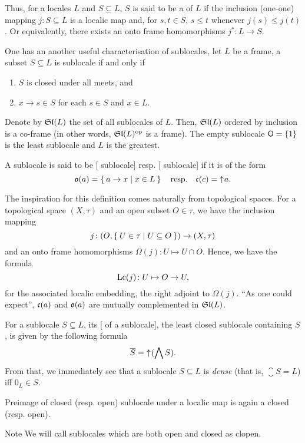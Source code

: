 Thus, for a locales $L$ and $S\subseteq L$, $S$ is said to be a  of $L$ if the inclusion (one-one) mapping $j\colon S\subseteq L$ is a localic map and, for $s,t\in S$, $s\leq t$ whenever $j(s)\leq j(t)$.
Or equivalently, there exists an onto frame homomorphisms $j^*\colon L\to S$.

One has an another useful characterisation of sublocales, let $L$ be a frame, a subset $S\subseteq L$ is sublocale if and only if
\begin{enumerate}[(S1)]
    \item $S$ is closed under all meets, and
    \item $x\to s\in S$ for each $s\in S$ and $x\in L$.
\end{enumerate}

Denote by $\mathfrak{Sl}(L)$ the set of all sublocales of $L$. Then, $\mathfrak{Sl}(L)$ ordered by inclusion is a co-frame (in other words, $\mathfrak{Sl}(L)^{\text{op}}$ is a frame). The empty sublocale $\mathsf{O} = \{1\}$ is the least sublocale and $L$ is the greatest.

A sublocale is said to be [ sublocale] resp. [ sublocale] if it is of the form
$$ \mathfrak{o}(a) = \Set{ a\to x | x\in L}\quad\text{resp.}\quad \mathfrak{c}(c) = \mathord{\uparrow}\mkern1mu a.$$

\noindent The inspiration for this definition comes naturally from topological spaces. For a topological space $(X,\tau)$ and an open subset $O\in \tau$, we have the inclusion mapping
$$ j\colon (O, \Set{U\in\tau | U\subseteq O})\to (X,\tau) $$
and an onto frame homomorphisms $\Omega(j)\colon U\mapsto U\cap O$. Hence, we have the formula 
$$ \operatorname{Lc}(j)\colon U\mapsto O\to U,$$
for the associated localic embedding, the right adjoint to $\Omega(j)$. ``As one could expect'', $\mathfrak{c}(a)$ and $\mathfrak{o}(a)$ are mutually complemented in $\mathfrak{Sl}(L)$.

For a sublocale $S\subseteq L$, its [ of a sublocale], the least closed sublocale containing $S$, is given by the following formula
$$ \overline{S} = \mathord{\uparrow}\mkern1mu (\bigwedge S). $$
From that, we immediately see that a sublocale $S\subseteq L$ is \emph{dense} (that is, $\closure S = L$) iff $0_L\in S$.

\begin{proposition*}
    Preimage of closed (resp. open) sublocale under a localic map is again a closed (resp. open).
\end{proposition*}

\begin{block*}{Note}
    We will call sublocales which are both open and closed as clopen. %
\end{block*}

